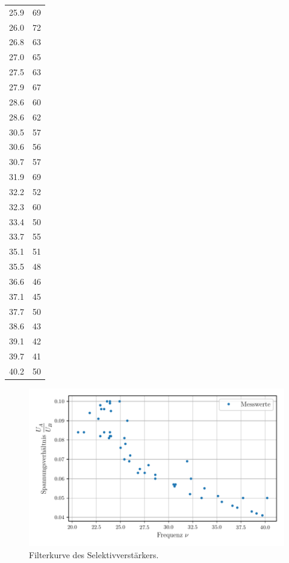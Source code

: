 \begin{table}
\begin{tabular}{c c}
      25.9   & 69 \\
      26.0   & 72 \\
      26.8   & 63 \\
      27.0   & 65 \\
      27.5   & 63 \\
      27.9   & 67 \\
      28.6   & 60 \\
      28.6   & 62 \\
      30.5   & 57 \\
      30.6   & 56 \\
      30.7   & 57 \\
      31.9   & 69 \\
      32.2   & 52 \\
      32.3   & 60 \\
      33.4   & 50 \\
      33.7   & 55 \\
      35.1   & 51 \\
      35.5   & 48 \\
      36.6   & 46 \\
      37.1   & 45 \\
      37.7   & 50 \\
      38.6   & 43 \\
      39.1   & 42 \\
      39.7   & 41 \\
      40.2   & 50 \\
    \bottomrule
  \end{tabular}
\end{table}

\begin{figure}
  \centering
  \caption{Filterkurve des Selektivverstärkers.}
  \label{fig:filterkurve}
  \includegraphics{content/filterkurve.pdf}
\end{figure}

